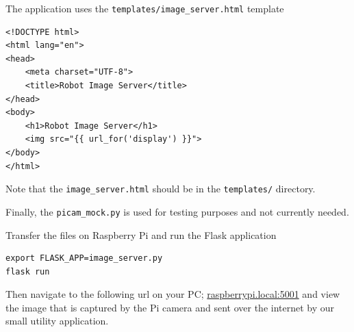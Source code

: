 The application uses the \lstinline{templates/image_server.html} template

\begin{lstlisting}
<!DOCTYPE html>
<html lang="en">
<head>
    <meta charset="UTF-8">
    <title>Robot Image Server</title>
</head>
<body>
    <h1>Robot Image Server</h1>
    <img src="{{ url_for('display') }}">
</body>
</html>
\end{lstlisting}


\begin{framed}
\begin{remark}

Note that the \lstinline{image_server.html} should be in the \lstinline{templates/} directory.
\end{remark}
\end{framed}

Finally, the \lstinline{picam_mock.py} is used for testing purposes and not currently needed.

Transfer the files on Raspberry Pi and  run the Flask application

\begin{lstlisting}
export FLASK_APP=image_server.py
flask run
\end{lstlisting}

Then navigate to the following url on your PC; \url{raspberrypi.local:5001} and view the image that 
is captured by the Pi camera and sent over the internet by our small utility application.
 





